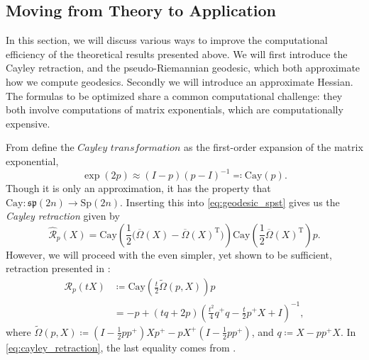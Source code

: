 \subsection{Moving from Theory to Application}\label{sec:theory_to_application}
In this section, we will discuss various ways to improve the computational efficiency of the theoretical results presented above. We will first introduce the Cayley retraction, and the pseudo-Riemannian geodesic, which both approximate how we compute geodesics. Secondly we will introduce an approximate Hessian. The formulas to be optimized share a common computational challenge: they both involve computations of matrix exponentials, which are computationally expensive. 

From \cite[p.~7]{JensenZimmermann2024} define the $\textit{Cayley transformation}$ as the first-order expansion of the matrix exponential,
%
\begin{equation*}
\exp(2p)\approx(I-p)(p-I)^{-1}\eqqcolon\mathrm{Cay}(p).
\end{equation*}
%
Though it is only an approximation, it has the property that $\mathrm{Cay}\colon\mathfrak{sp}(2n)\to \mathrm{Sp}(2n)$. Inserting this into \eqref{eq:geodesic_spst} gives us the \textit{Cayley retraction} given by
%
\begin{equation*}
\hat{\mathcal{R}}_{p}(X)=\mathrm{Cay}\left( \frac{1}{2}\big(\overline{\Omega}(X)-\overline{\Omega}(X)^{\mathrm{T}}\big) \right)\mathrm{Cay}\left( \frac{1}{2}\overline{\Omega}(X)^{\mathrm{T}} \right)p.
\end{equation*}
However, we will proceed with the even simpler, yet shown to be sufficient, retraction presented in \cite[p.~20]{BendokatZimmermann2021}:
%
\begin{equation}
    \label{eq:cayley_retraction}
    \begin{split}
        \mathcal{R}_{p}(tX)&\coloneqq\mathrm{Cay}\left( \frac{t}{2}\tilde{\Omega}(p,X) \right)p \\
        &=-p+(tq+2p)\left( \frac{t^{2}}{4}q^{+}q- \frac{t}{2}p^{+}X+I \right)^{-1},
    \end{split}
\end{equation}
%
where $\tilde{\Omega}(p,X)\coloneqq\left( I- \frac{1}{2}pp^{+} \right)Xp^{+}-pX^{+}\left( I- \frac{1}{2}pp^{+} \right)$, and $q\coloneqq X-pp^{+}X$. In \eqref{eq:cayley_retraction},  the last equality comes from \cite[Prop.~5.2]{BendokatZimmermann2021}.

